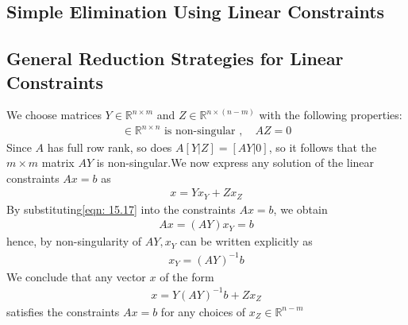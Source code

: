 \subsection{Simple Elimination Using Linear Constraints} \label{subsec:-elimination-linear-constraints}

\subsection{General Reduction Strategies for Linear Constraints} \label{subsec:-reduction-linear-constraints}
We choose matrices $Y\in\mathbb{R}^{n\times m}$ and $Z\in\mathbb{R}^{n\times (n - m)}$
with the following properties:
\begin{align}
[Y|Z]\in\mathbb{R}^{n\times n} \text{ is non-singular } , \quad AZ = 0 \tag{15.16}\label{chap15: partition}
\end{align}
Since $A$ has full row rank, so does $A[Y|Z] = [AY|0]$, so it follows that the $m\times m$ matrix $AY$
is non-singular.We now express any solution of the linear constraints $Ax = b$ as
\begin{align}
    x = Yx_Y + Zx_Z \tag{15.17}\label{eqn: 15.17}
\end{align}
By substituting\eqref{eqn: 15.17} into the constraints $Ax = b$, we obtain
\begin{align*}
    Ax = (AY)x_Y = b
\end{align*}
hence, by non-singularity of $AY, x_Y$ can be written explicitly as
\begin{align}
    x_Y = (AY)^{-1}b \tag{15.18}\label{eqn: 15.18}
\end{align}
We conclude that any vector $x$ of the form
\begin{align}
    x = Y(AY)^{-1}b + Zx_Z \tag{15.19}\label{eqn: 15.19}
\end{align}
satisfies the constraints $Ax = b$ for any choices of $x_Z\in\mathbb{R}^{n-m}$